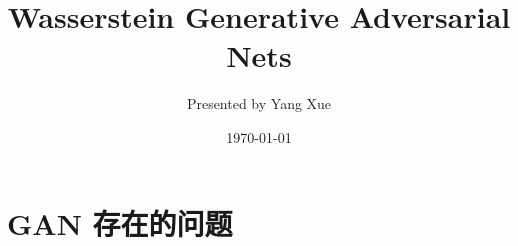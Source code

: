 \documentclass[xelatex]{beamer}
\title[]{Wasserstein Generative Adversarial Nets}
\author{Presented by Yang Xue}
\institute[SCU]
{
Sichuan University \\
\medskip
}
\date{\today}
\begin{document}
\begin{frame}
\titlepage
\end{frame}



\section{GAN 存在的问题}
\end{document}
